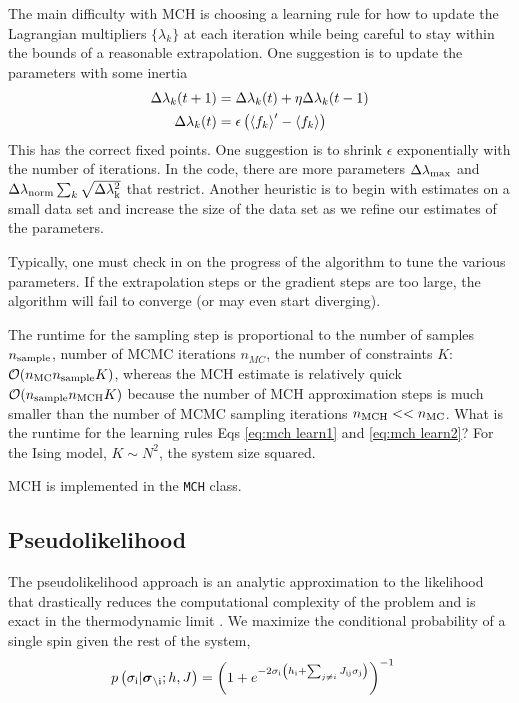 \documentclass[aps,prl,twocolumn]{revtex4-1}
\begin{document}
The main difficulty with MCH is choosing a learning rule for how to update the Lagrangian multipliers $\{\lambda_k\}$ at each iteration while being careful to stay within the bounds of a reasonable extrapolation. One suggestion is to update the parameters with some inertia
\begin{align}
	\Delta\lambda_k(t+1) &= \Delta \lambda_k(t) + \eta \Delta\lambda_k(t-1)\label{eq:mch learn1}\\
	\Delta \lambda_k(t) &= \epsilon\left(\left<f_k\right>'-\left<f_k\right>\right)\label{eq:mch learn2}
\end{align}
This has the correct fixed points. One suggestion is to shrink $\epsilon$ exponentially with the number of iterations. In the code, there are more parameters $\Delta\lambda_{\rm max}$ and $\Delta\lambda_{\rm norm}\sum_k \sqrt{\Delta\lambda_{\rm k}^2}$ that restrict. Another heuristic is to begin with estimates on a small data set and increase the size of the data set as we refine our estimates of the parameters.

Typically, one must check in on the progress of the algorithm to tune the various parameters. If the extrapolation steps or the gradient steps are too large, the algorithm will fail to converge (or may even start diverging).

The runtime for the sampling step is proportional to the number of samples $n_{\rm sample}$, number of MCMC iterations $n_{MC}$, the number of constraints $K$:
$\mathcal{O}(n_{\rm MC} n_{\rm sample} K)$, whereas the MCH estimate is relatively quick $\mathcal{O}(n_{\rm sample}n_{\rm MCH}K)$ because the number of MCH approximation steps is much smaller than the number of MCMC sampling iterations $n_{\rm MCH}<<n_{\rm MC}$. What is the runtime for the learning rules Eqs \ref{eq:mch learn1} and \ref{eq:mch learn2}?
For the Ising model, $K\sim N^2$, the system size squared.

MCH is implemented in the {\tt MCH} class.

\subsection{Pseudolikelihood}
The pseudolikelihood approach is an analytic approximation to the likelihood that drastically reduces the computational complexity of the problem and is exact in the thermodynamic limit \cite{Aurell:2012hi}. We maximize the conditional probability of a single spin given the rest of the system,
\begin{align}
	p\left(\sigma_{\rm i}|\boldsymbol{\sigma}_{\backslash \rm i};h,J\right) &= \left( 1+e^{-2\sigma_{\rm i} \left(h_{\rm i}+\sum_{j\neq i}J_{\rm ij}\sigma_{\rm j}\right)} \right)^{-1}
\end{align}
\end{document}
